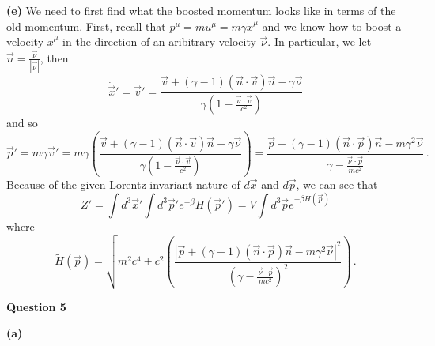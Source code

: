\documentclass[10pt]{article}
\begin{document}
\textbf{(e)} We need to first find what the boosted momentum looks like in terms of the old momentum. First, recall that $p^{\mu} = mu^{\mu} = m\gamma \dot{x}^{\mu}$ and we know how to boost a velocity $\dot{x}^{\mu}$ in the direction of an aribitrary velocity $\vec{\nu}$. In particular, we let $\vec{n} = \frac{\vec{\nu}}{|\vec{\nu}|}$, then
\[ \dot{\vec{x}}' = \vec{v}' = \frac{\vec{v}+ (\gamma - 1)(\vec{n}\cdot \vec{v})\vec{n} - \gamma \vec{\nu}}{\gamma(1- \frac{\vec{\nu}\cdot \vec{v}}{c^{2}})} \]
and so
\[ \vec{p}' = m\gamma \vec{v}' = m\gamma \left(\frac{\vec{v}+ (\gamma - 1)(\vec{n}\cdot \vec{v})\vec{n} - \gamma \vec{\nu}}{\gamma(1- \frac{\vec{\nu}\cdot \vec{v}}{c^{2}})}\right) = \frac{\vec{p}+ (\gamma - 1)(\vec{n}\cdot \vec{p})\vec{n} - m\gamma^{2} \vec{\nu}}{\gamma - \frac{\vec{\nu}\cdot \vec{p}}{mc^{2}}} \, .\]
Because of the given Lorentz invariant nature of $d\vec{x}$ and $d\vec{p}$, we can see that
\[ Z' = \int d^{3}\vec{x}'\int d^{3}\vec{p}'e^{-\beta}H(\vec{p}') = V\int d^{3}\vec{p}e^{-\beta \tilde{H}(\vec{p})}\]
where
\[ \tilde{H}(\vec{p}) = \sqrt{m^{2}c^{4} + c^{2}\left(\frac{|\vec{p}+ (\gamma - 1)(\vec{n}\cdot \vec{p})\vec{n} - m\gamma^{2} \vec{\nu}|^{2}}{(\gamma - \frac{\vec{\nu}\cdot \vec{p}}{mc^{2}})^{2}}\right)} \, .\]

\newpage
\textbf{Question 5}

\textbf{(a)}
\end{document}
